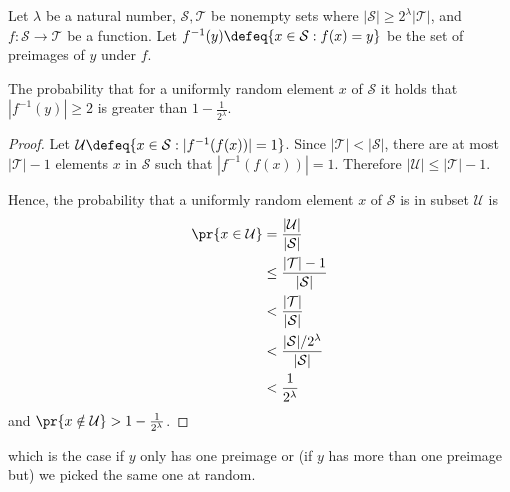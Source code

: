 \begin{lemma}
  \label{lem:preimage-size}
  Let $\lambda$ be a natural number, $\mathcal{S}, \mathcal{T}$ be nonempty sets where $|\mathcal{S}| \ge 2^\lambda |\mathcal{T}|$, and $f: \mathcal{S} \rightarrow \mathcal{T}$ be a function.
  Let $f^{-1}(y) \defeq \{x \in \mathcal{S} : f(x) = y\}$ be the set of preimages of $y$ under $f$.

  The probability that for a uniformly random element $x$ of $\mathcal{S}$ it holds that $|f^{-1}(y)| \ge 2$ is greater than $1- \frac{1}{2^\lambda}$.
\end{lemma}
\begin{proof}
  Let $\mathcal{U} \defeq \{ x \in \mathcal{S} : |f^{-1}(f(x))| = 1\}$.
  Since $|\mathcal{T}| < |\mathcal{S}|$, there are at most $|\mathcal{T}| - 1$ elements $x$ in $\mathcal{S}$ such that $|f^{-1}(f(x))| = 1$.
  Therefore $|\mathcal{U}| \le |\mathcal{T}| - 1$.

  Hence, the probability that a uniformly random element $x$ of $\mathcal{S}$ is in subset $\mathcal{U}$ is
  \begin{align*}
    \pr{x \in \mathcal{U}} &= \frac{|\mathcal{U}|}{|\mathcal{S}|} \\
    &\le \frac{|\mathcal{T}| - 1}{|\mathcal{S}|}\\
    &< \frac{|\mathcal{T}|}{|\mathcal{S}|}\\
    &< \frac{|\mathcal{S}|/2^\lambda}{|\mathcal{S}|}\\
    &< \frac{1}{2^\lambda}
  \end{align*}
  and $\pr{x \notin \mathcal{U}} > 1- \frac{1}{2^\lambda}$.
\end{proof}



  which is the case if $y$ only has one preimage or (if $y$ has more than one preimage but) we picked the same one at random.



